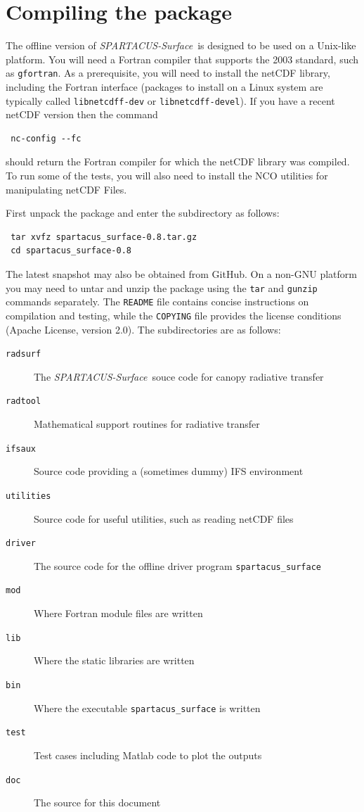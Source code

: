 \documentclass[a4,oneside]{article}
\def\codesize{\small}
\def\spsurf{\emph{SPARTACUS-Surface}}
\def\code#1{{\codesize\texttt{#1}}}
\def\citem#1{\item[{\codesize\texttt{#1}}]}
\def\chapter{\section}
\begin{document}

\section{Compiling the package}
\label{sec:compile}
The offline version of \spsurf\ is designed to be used on a Unix-like
platform. You will need a Fortran compiler that supports the 2003
standard, such as \code{gfortran}.
%
As a prerequisite, you will need to install the netCDF library,
including the Fortran interface (packages to install on a Linux system
are typically called \code{libnetcdff-dev} or
\code{libnetcdff-devel}).  If you have a recent netCDF version then
the command
\begin{lstlisting}
 nc-config --fc
\end{lstlisting}
should return the Fortran compiler for which the netCDF library was
compiled.  To run some of the tests, you will also need to install the
NCO utilities for manipulating netCDF Files.

First unpack the package and enter the subdirectory as follows:
\begin{lstlisting}
 tar xvfz spartacus_surface-0.8.tar.gz
 cd spartacus_surface-0.8
\end{lstlisting}
The latest snapshot may also be obtained from GitHub.  On a non-GNU
platform you may need to untar and unzip the package using the
\code{tar} and \code{gunzip} commands separately. The \code{README}
file contains concise instructions on compilation and testing, while
the \code{COPYING} file provides the license conditions (Apache
License, version 2.0). The subdirectories are as follows:
%
\begin{description}
\citem{radsurf} The \spsurf\ souce code for canopy radiative transfer
\citem{radtool} Mathematical support routines for radiative transfer
\citem{ifsaux} Source code providing a (sometimes dummy) IFS environment
\citem{utilities} Source code for useful utilities, such as reading netCDF
       files
\citem{driver} The source code for the offline driver program \code{spartacus\_surface}
\citem{mod} Where Fortran module files are written
\citem{lib} Where the static libraries are written
\citem{bin} Where the executable \code{spartacus\_surface} is written
\citem{test} Test cases including Matlab code to plot the outputs
\citem{doc} The source for this document
\end{description}
\end{document}
